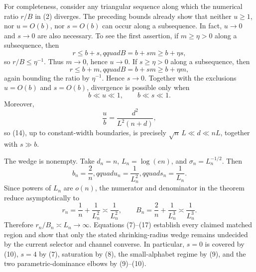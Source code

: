 For completeness, consider any triangular sequence along which the numerical ratio \(r/B\) in (2) diverges.  The preceding bounds already show that neither \(u\ge1\), nor \(u=O(b)\), nor \(s=O(b)\) can occur along a subsequence.  In fact, \(u\to0\) and \(s\to0\) are also necessary.  To see the first assertion, if \(m\ge\eta>0\) along a subsequence, then
\[
 r\le b+s,qquad B=b+sm\ge b+\eta s,
\tag{12}
\]
so \(r/B\le\eta^{-1}\).  Thus \(m\to0\), hence \(u\to0\).  If \(s\ge\eta>0\) along a subsequence, then
\[
 r\le b+m,qquad B=b+sm\ge b+\eta m,
\tag{13}
\]
again bounding the ratio by \(\eta^{-1}\).  Hence \(s\to0\).  Together with the exclusions \(u=O(b)\) and \(s=O(b)\), divergence is possible only when
\[
 b\ll u\ll1,
 \qquad b\ll s\ll1.
\tag{14}
\]
Moreover,
\[
 \frac ub=\frac{d^2}{L^2(n+d)},
\tag{15}
\]
so (14), up to constant-width boundaries, is precisely \(\sqrt n\,L\ll d\ll nL\), together with \(s\gg b\).

The wedge is nonempty.  Take \(d_n=n\), \(L_n=\log(en)\), and \(\sigma_n=L_n^{-1/2}\).  Then
\[
 b_n=\frac2n,qquad u_n=\frac1{L_n^2},qquad s_n=\frac1{L_n}.
\tag{16}
\]
Since powers of \(L_n\) are \(o(n)\), the numerator and denominator in the theorem reduce asymptotically to
\[
 r_n=\frac1n+\frac1{L_n^2}\asymp\frac1{L_n^2},
 \qquad
 B_n=\frac2n+\frac1{L_n^3}\asymp\frac1{L_n^3}.
\tag{17}
\]
Therefore \(r_n/B_n\asymp L_n\to\infty\).  Equations (7)--(17) establish every claimed matched region and show that only the stated shrinking-radius wedge remains undecided by the current selector and channel converse.  In particular, \(s=0\) is covered by (10), \(s=4\) by (7), saturation by (8), the small-alphabet regime by (9), and the two parametric-dominance elbows by (9)--(10).